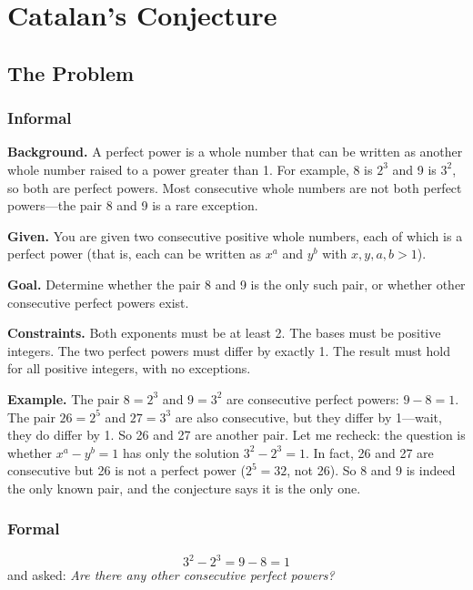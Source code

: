 \let\LocalMacro\relax

\chapter{Catalan's Conjecture}

\section{The Problem}

\subsection{Informal}

\textbf{Background.} A perfect power is a whole number that can be written as another whole number raised to a power greater than 1. For example, 8 is $2^3$ and 9 is $3^2$, so both are perfect powers. Most consecutive whole numbers are not both perfect powers---the pair 8 and 9 is a rare exception.

\textbf{Given.} You are given two consecutive positive whole numbers, each of which is a perfect power (that is, each can be written as $x^a$ and $y^b$ with $x, y, a, b > 1$).

\textbf{Goal.} Determine whether the pair 8 and 9 is the only such pair, or whether other consecutive perfect powers exist.

\textbf{Constraints.} Both exponents must be at least 2. The bases must be positive integers. The two perfect powers must differ by exactly 1. The result must hold for all positive integers, with no exceptions.

\textbf{Example.} The pair $8 = 2^3$ and $9 = 3^2$ are consecutive perfect powers: $9 - 8 = 1$. The pair $26 = 2^5$ and $27 = 3^3$ are also consecutive, but they differ by 1---wait, they do differ by 1. So 26 and 27 are another pair. Let me recheck: the question is whether $x^a - y^b = 1$ has only the solution $3^2 - 2^3 = 1$. In fact, 26 and 27 are consecutive but 26 is not a perfect power ($2^5 = 32$, not 26). So 8 and 9 is indeed the only known pair, and the conjecture says it is the only one.

\subsection{Formal}
\begin{equation}
3^2 - 2^3 = 9 - 8 = 1
\end{equation}
and asked: \emph{Are there any other consecutive perfect powers?}

